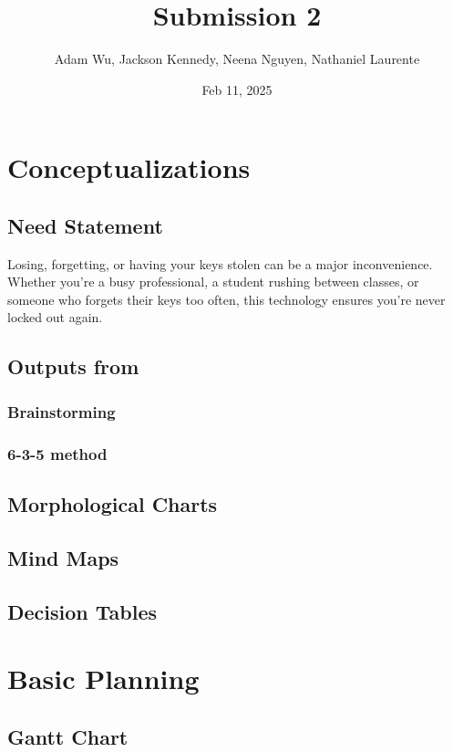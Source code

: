 \documentclass{article}
\title{Submission 2}
\author{Adam Wu, Jackson Kennedy, Neena Nguyen, Nathaniel Laurente}
\date{Feb 11, 2025}
\begin{document}
\maketitle

\tableofcontents

\section{Conceptualizations}
\subsection{Need Statement}

Losing, forgetting, or having your keys stolen can be a major inconvenience. Whether you're a busy professional, a student rushing between classes, or someone who forgets their keys too often, this technology ensures you’re never locked out again.

\subsection{Outputs from}
\subsubsection{Brainstorming}

\subsubsection{6-3-5 method}

\subsection{Morphological Charts}

\subsection{Mind Maps}

\subsection{Decision Tables}

\section{Basic Planning}
\subsection{Gantt Chart}
\end{document}
